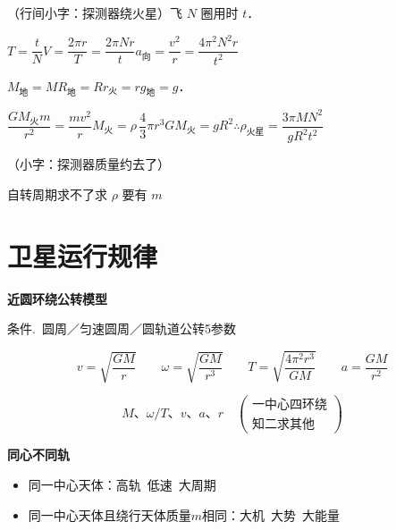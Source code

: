 \begin{problem}[9]
（行间小字：探测器绕火星）飞 $N$ 圈用时 $t$．
\begin{solution}
$T=\dfrac tN$\quad $V=\dfrac{2\pi r}{T}=\dfrac{2\pi Nr}{t}$\quad $a_{\text{向}}=\dfrac{v^2}{r}=\dfrac{4\pi^2N^2r}{t^2}$%

$M_{\text{地}}=M$\quad $R_{\text{地}}=R$\quad $r_{\text{火}}=r$\quad $g_{\text{地}}=g$．

$\dfrac{GM_{\text{火}}m}{r^2}=\dfrac{mv^2}{r}$\quad $M_{\text{火}}=\rho\,\dfrac43\pi r^3$\quad $GM_{\text{火}}=gR^2$\quad $\therefore\rho_{\text{火星}}=\dfrac{3\pi MN^2}{gR^2t^2}$%

（小字：探测器质量约去了）

自转周期求不了\quad 求 $\rho$ 要有 $m$%
\end{solution}
\end{problem}


\section{卫星运行规律}
\textbf{近圆环绕公转模型}

条件.\ 圆周／匀速圆周／圆轨道\hfill 公转5参数

\[
v=\sqrt{\frac{GM}{r}}\qquad
\omega=\sqrt{\frac{GM}{r^{3}}}\qquad
T=\sqrt{\frac{4\pi^{2}r^{3}}{GM}}\qquad
a=\frac{GM}{r^{2}}
\]

\[
M\text{、}\omega/T\text{、}v\text{、}a\text{、}r\quad
\left(\begin{array}{l}\text{一中心四环绕}\\ \text{知二求其他}\end{array}\right)
\]

\textbf{同心不同轨}
\begin{itemize}
\item 同一中心天体：高轨\ 低速\ 大周期
\item 同一中心天体且绕行天体质量$m$相同：大机\ 大势\ 大能量
\end{itemize}

